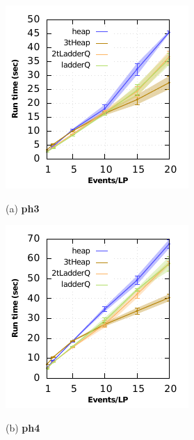 \begin{figure}
\begin{minipage}{0.49\linewidth}
\includegraphics[width=\linewidth]{images/ph3_run_time}
\centerline{(a) \textbf{ph3}}
\end{minipage}
\begin{minipage}{0.49\linewidth}
\includegraphics[width=\linewidth]{images/ph4_run_time}
\centerline{(b) \textbf{ph4}}
\end{minipage}


\end{figure}
